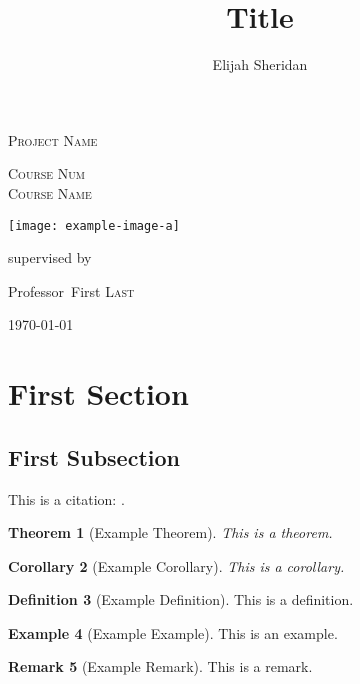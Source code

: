 \documentclass[10pt]{article}
\title{Title}  %
\author{Elijah Sheridan} %
\numberwithin{equation}{section}
\theoremstyle{plain}
\newtheorem{Th}{Theorem}[section]
\newtheorem{Cor}[Th]{Corollary}
\theoremstyle{definition}
\newtheorem{Def}[Th]{Definition}
\newtheorem{Ex}[Th]{Example}
\newtheorem{Rem}[Th]{Remark}
\begin{document}

\begin{titlepage}
	\centering
	{\scshape\Large Project Name \par}  %
	\vspace{0.75cm}
	{\scshape\Large Course Num \\Course Name \par}  %
	\vspace{1cm}
	\texttt{[image: example-image-a]}\par\vspace{1cm}
	{\scshape\LARGE \MyTitle \par}
	\vspace{1.25cm}
	{\Large\itshape \MyAuthor \par}
	\vfill
	supervised by\par
	Professor~First \textsc{Last}  %
	\vfill
	{\large \today\par}
\end{titlepage}

\pagestyle{fancy}
\lhead{\MyTitle}  %
\rhead{\thepage}  %


\tableofcontents

\newpage


\section{First Section}

\subsection{First Subsection}

This is a citation: \cite{test}.

\begin{Th}[Example Theorem]
This is a theorem.
\end{Th}

\begin{Cor}[Example Corollary]
This is a corollary.
\end{Cor}

\begin{Def}[Example Definition]
This is a definition.
\end{Def}

\begin{Ex}[Example Example]
This is an example.
\end{Ex}

\begin{Rem}[Example Remark]
This is a remark.
\end{Rem}

\newpage




\end{document}
